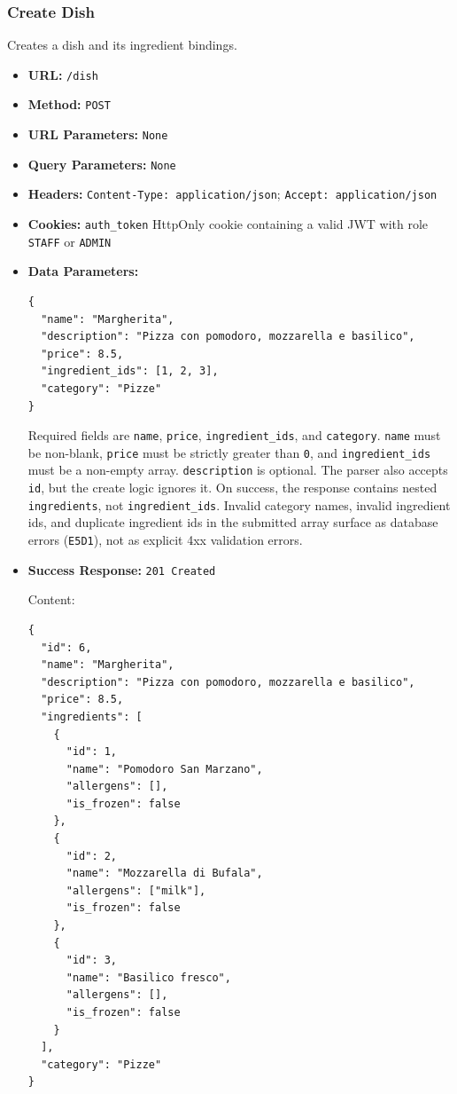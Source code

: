 \subsubsection*{Create Dish}

Creates a dish and its ingredient bindings.

\begin{itemize}[nosep]
\item \textbf{URL:} \texttt{/dish}

\item \textbf{Method:} \texttt{POST}

\item \textbf{URL Parameters:} \texttt{None}

\item \textbf{Query Parameters:} \texttt{None}

\item \textbf{Headers:} \texttt{Content-Type: application/json}; \texttt{Accept: application/json}

\item \textbf{Cookies:} \texttt{auth\_token} HttpOnly cookie containing a valid JWT with role \texttt{STAFF} or \texttt{ADMIN}

\item \textbf{Data Parameters:}

\begin{lstlisting}
{
  "name": "Margherita",
  "description": "Pizza con pomodoro, mozzarella e basilico",
  "price": 8.5,
  "ingredient_ids": [1, 2, 3],
  "category": "Pizze"
}
\end{lstlisting}

Required fields are \texttt{name}, \texttt{price}, \texttt{ingredient\_ids}, and \texttt{category}. \texttt{name} must be non-blank, \texttt{price} must be strictly greater than \texttt{0}, and \texttt{ingredient\_ids} must be a non-empty array. \texttt{description} is optional. The parser also accepts \texttt{id}, but the create logic ignores it. On success, the response contains nested \texttt{ingredients}, not \texttt{ingredient\_ids}. Invalid category names, invalid ingredient ids, and duplicate ingredient ids in the submitted array surface as database errors (\texttt{E5D1}), not as explicit 4xx validation errors.

\item \textbf{Success Response:} \texttt{201 Created}

Content:

\begin{lstlisting}
{
  "id": 6,
  "name": "Margherita",
  "description": "Pizza con pomodoro, mozzarella e basilico",
  "price": 8.5,
  "ingredients": [
    {
      "id": 1,
      "name": "Pomodoro San Marzano",
      "allergens": [],
      "is_frozen": false
    },
    {
      "id": 2,
      "name": "Mozzarella di Bufala",
      "allergens": ["milk"],
      "is_frozen": false
    },
    {
      "id": 3,
      "name": "Basilico fresco",
      "allergens": [],
      "is_frozen": false
    }
  ],
  "category": "Pizze"
}
\end{lstlisting}


\end{itemize}
